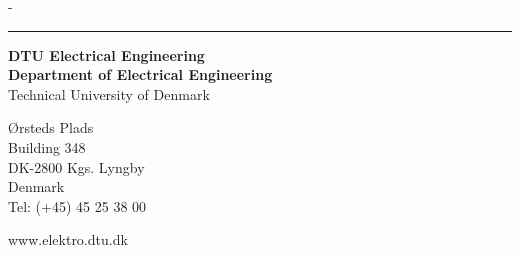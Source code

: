 \thispagestyle{empty} %
\frieze
\begin{adjustwidth*}{\unitlength}{-\unitlength}
    \begin{adjustwidth}{-0.5cm}{-0.5cm}
		\vspace*{3.5cm}
		\textcolor{dtured}{\rule{\textwidth + 1.5cm}{4pt}}
	\end{adjustwidth}
\end{adjustwidth*}
\vspace*{\fill}
\noindent
\sffamily
\small
\textbf{DTU Electrical Engineering \\
 Department of Electrical Engineering }\\ 
 Technical University of Denmark
 
 \noindent Ørsteds Plads \\ 
 Building 348 \\ 
 DK-2800 Kgs. Lyngby \\ 
 Denmark \\
 Tel: (+45) 45 25 38 00
 
\noindent www.elektro.dtu.dk
\normalsize
\normalfont
\vspace*{2.5cm}
